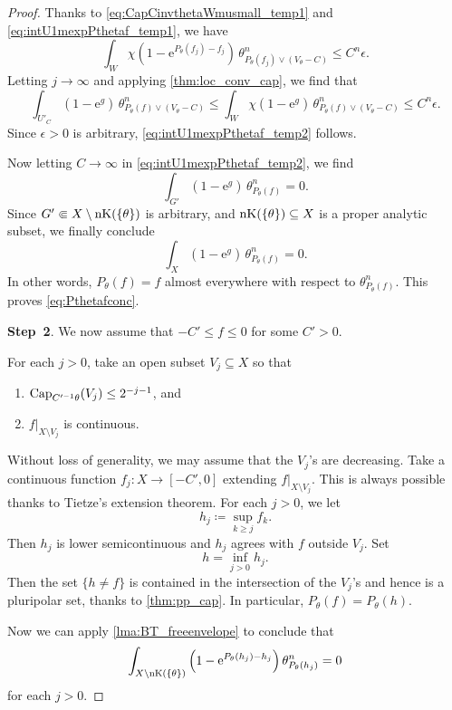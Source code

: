 \begin{proof}
    Thanks to \eqref{eq:CapCinvthetaWmusmall_temp1} and \eqref{eq:intU1mexpPthetaf_temp1}, we have
    \[
    \int_W \chi\left( 1-\mathrm{e}^{P_{\theta}(f_j)-f_j} \right)\,\theta_{P_{\theta}(f_j)\lor (V_{\theta}-C)}^n\leq C^n\epsilon.
    \]
    Letting $j\to\infty$ and applying \cref{thm:loc_conv_cap}, we find that
    \[
    \int_{U'_C} \left( 1-\mathrm{e}^{g} \right)\,\theta_{P_{\theta}(f)\lor (V_{\theta}-C)}^n\leq \int_W \chi\left( 1-\mathrm{e}^{g} \right)\,\theta_{P_{\theta}(f)\lor (V_{\theta}-C)}^n\leq C^n\epsilon.
    \]
    Since $\epsilon>0$ is arbitrary, \eqref{eq:intU1mexpPthetaf_temp2} follows.

    Now letting $C\to\infty$ in \eqref{eq:intU1mexpPthetaf_temp2}, we find
    \[
    \int_{G'}\left( 1-\mathrm{e}^{g} \right)\,\theta_{P_{\theta}(f)}^n=0.
    \]
    Since $G'\Subset X\setminus \operatorname{nK}(\{\theta\})$ is arbitrary, and $\operatorname{nK}(\{\theta\})\subseteq X$ is a proper analytic subset, we finally conclude
    \[
    \int_X \left( 1-\mathrm{e}^{g} \right)\,\theta_{P_{\theta}(f)}^n=0.
    \]
    In other words, $P_{\theta}(f)=f$ almost everywhere with respect to $\theta_{P_{\theta}(f)}^n$. This proves \eqref{eq:Pthetafconc}.

    \textbf{Step~2}. We now assume that $-C'\leq f\leq 0$ for some $C'>0$.

    For each $j>0$, take an open subset $V_j\subseteq X$ so that
    \begin{enumerate}
        \item\label{itm:chapter-npp:L662:1} $\operatorname{Cap}_{C'^{-1}\theta}(V_j)\leq 2^{-j-1}$, and
        \item\label{itm:chapter-npp:L662:2} $f|_{X\setminus V_j}$ is continuous.
    \end{enumerate}
    Without loss of generality, we may assume that the $V_j$'s are decreasing. Take a continuous function $f_j\colon X\rightarrow [-C',0]$ extending $f|_{X\setminus V_j}$. This is always possible thanks to Tietze's extension theorem. For each $j>0$, we let
    \[
    h_j\coloneqq \sup_{k\geq j} f_k.
    \]
    Then $h_j$ is lower semicontinuous and $h_j$ agrees with $f$ outside $V_j$.
    Set
    \[
    h=\inf_{j>0} h_j.
    \]
    Then the set $\{h\neq f\}$ is contained in the intersection of the $V_j$'s and hence is a pluripolar set, thanks to \cref{thm:pp_cap}. In particular, $P_{\theta}(f)=P_{\theta}(h)$.

    Now we can apply \cref{lma:BT_freeenvelope} to conclude that
    \[
    \int_{X\setminus \operatorname{nK}(\{\theta\})} \left(1-\mathrm{e}^{P_{\theta}(h_j)-h_j} \right) \theta_{P_{\theta}(h_j)}^n=0
    \]
    for each $j>0$.


\end{proof}
